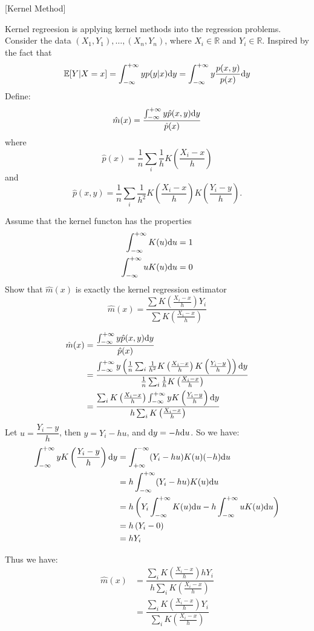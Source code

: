 \item {} [Kernel Method]

Kernel regreesion is applying kernel methods into the regression problems. Consider the data $\left(X_{1}, Y_{1}\right), \ldots,\left(X_{n}, Y_{n}\right)$, where $X_{i} \in \mathbb{R}$ and $Y_{i} \in \mathbb{R}$. Inspired by the fact that
$$\mathbb{E}[Y | X=x]=\int_{-\infty}^{+\infty} y p(y|x) \mathrm{d}y=\int_{-\infty}^{+\infty} y \dfrac{p(x, y)}{p(x)} \mathrm{d}y$$
Define:
$$\hat{m}(x)=\dfrac{\int_{-\infty}^{+\infty} y \hat{p}(x, y) \mathrm{d}y}{\hat{p}(x)}$$
where
$$\hat{p}(x)=\dfrac{1}{n} \sum_{i} \dfrac{1}{h} K\left(\frac{X_{i}-x}{h}\right)$$
and
$$\hat{p}(x, y)= \frac{1}{n} \sum_{i} \frac{1}{h^{2}} K\left(\frac{X_{i}-x}{h}\right) K\left(\frac{Y_{i}-y}{h}\right) .$$

Assume that the kernel functon has the properties
\begin{align*}
\int_{-\infty}^{+\infty} K(u) \mathrm{d}u &= 1 \\
\int_{-\infty}^{+\infty} uK(u) \mathrm{d}u &= 0
\end{align*}
Show that $\hat{m}(x)$ is exactly the kernel regression estimator
$$\hat{m}(x) = \dfrac{\sum K\left(\frac{X_{i}-x}{h}\right) Y_{i}}{\sum K\left(\frac{X_{i}-x}{h}\right)}$$

\solution

\begin{align*}
\hat{m}(x) &= \dfrac{\int_{-\infty}^{+\infty} y \hat{p}(x, y) \mathrm{d}y}{\hat{p}(x)} \\
&= \dfrac{\int_{-\infty}^{+\infty} y \left(\frac{1}{n} \sum_{i} \frac{1}{h^{2}} K\left(\frac{X_{i}-x}{h}\right) K\left(\frac{Y_{i}-y}{h}\right)\right) \mathrm{d}y}{\frac{1}{n} \sum_{i} \frac{1}{h} K\left(\frac{X_{i}-x}{h}\right)} \\
&= \dfrac{\sum_{i}  K\left(\frac{X_{i}-x}{h}\right) \int_{-\infty}^{+\infty} y K\left(\frac{Y_{i}-y}{h}\right) \mathrm{d}y}{h \sum_{i} K\left(\frac{X_{i}-x}{h}\right)} \\
\end{align*}
Let $u = \dfrac{Y_{i}-y}{h}$, then $y = Y_{i} - hu$, and $\mathrm{d}y = -h \mathrm{d}u$. So we have:
\begin{align*}
\int_{-\infty}^{+\infty} y K\left(\frac{Y_{i}-y}{h}\right) \mathrm{d}y &= \int_{+\infty}^{-\infty} (Y_{i} - hu) K(u) (-h) \mathrm{d}u \\
&= h\int_{-\infty}^{+\infty} (Y_{i} - hu) K(u) \mathrm{d}u \\
&= h\left(Y_{i} \int_{-\infty}^{+\infty} K(u) \mathrm{d}u - h \int_{-\infty}^{+\infty} u K(u) \mathrm{d}u\right) \\
&= h\left(Y_{i} - 0\right) \\
&= hY_{i}
\end{align*}

Thus we have:
\begin{align*}
\hat{m}(x) &= \dfrac{\sum_{i}  K\left(\frac{X_{i}-x}{h}\right) hY_{i}}{h \sum_{i} K\left(\frac{X_{i}-x}{h}\right)} \\
&= \dfrac{\sum_{i}  K\left(\frac{X_{i}-x}{h}\right) Y_{i}}{\sum_{i} K\left(\frac{X_{i}-x}{h}\right)} \\
\end{align*}

\newpage